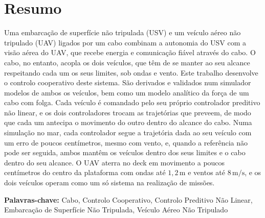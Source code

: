 
\section*{Resumo}


Uma embarcação de superfície não tripulada (USV) e um veículo aéreo não tripulado (UAV) ligados por um cabo combinam a autonomia do USV com a visão aérea do UAV, que recebe energia e comunicação fiável através do cabo. O cabo, no entanto, acopla os dois veículos, que têm de se manter ao seu alcance respeitando cada um os seus limites, sob ondas e vento. Este trabalho desenvolve o controlo cooperativo deste sistema. São derivados e validados num simulador modelos de ambos os veículos, bem como um modelo analítico da força de um cabo com folga. Cada veículo é comandado pelo seu próprio controlador preditivo não linear, e os dois controladores trocam as trajetórias que preveem, de modo que cada um antecipa o movimento do outro dentro do alcance do cabo. Numa simulação no mar, cada controlador segue a trajetória dada ao seu veículo com um erro de poucos centímetros, mesmo com vento, e, quando a referência não pode ser seguida, ambos mantêm os veículos dentro dos seus limites e o cabo dentro do seu alcance. O UAV aterra no deck em movimento a poucos centímetros do centro da plataforma com ondas até $1{,}2\,\text{m}$ e ventos até $8\,\text{m/s}$, e os dois veículos operam como um só sistema na realização de missões.

\vfill

\textbf{\Large Palavras-chave:} Cabo, Controlo Cooperativo, Controlo Preditivo Não Linear, Embarcação de Superfície Não Tripulada, Veículo Aéreo Não Tripulado

